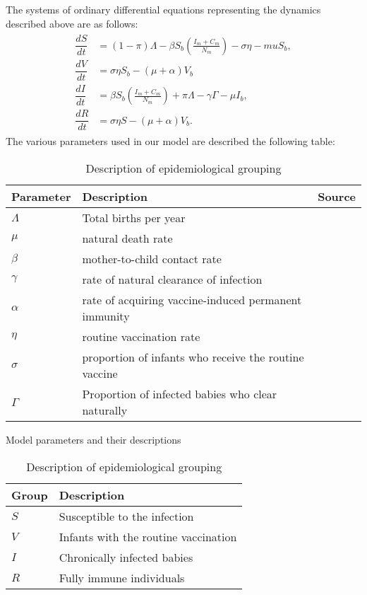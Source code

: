The systems of ordinary differential equations representing the dynamics described above are as follows:
\begin{align}
\begin{split}
\dfrac{dS}{dt}&=(1-\pi)\Lambda -\beta S_b(\frac{I_m+C_m}{N_m})-\sigma\eta-muS_b,\\
\dfrac{dV}{dt}&=\sigma\eta S_b-(\mu+\alpha) V_b\\
\dfrac{dI}{dt}&=\beta S_b(\frac{I_m+C_m}{N_m}) + \pi\Lambda-\gamma\Gamma-\mu I_b,\\
\dfrac{dR}{dt}&=\sigma\eta S - (\mu +\alpha) V_b.
\end{split}
\end{align}
The various parameters used in our model are described the following table:

\vspace{1cm}
\begin{table}[h]
	\centering
	\begin{tabular}{ |p{1.57cm}|p{10cm}|p{2cm}| }
		\hline
		Parameter& Description &    Source \\
		\hline
		$\Lambda$    		& 	Total births per year  					&																																								\\
		$	\mu $					&  	natural death rate   &																																									\\
		$\beta$ 					& 	mother-to-child contact rate &																																			\\
		$\gamma$ 			& 	rate of natural clearance of infection										&																							\\
		$\alpha$ 				& 	rate of acquiring vaccine-induced permanent immunity	&																								\\
		$\eta  $					& routine vaccination rate																&																								\\
		$\sigma$ 				& 	proportion of infants who receive the routine vaccine &																							\\
		$\Gamma$			& 	Proportion of infected babies who clear naturally		&																						\\
		\hline
	\end{tabular}
	\caption{Model parameters and their descriptions}
	\label{table:1}
	
	
		\centering
		\begin{tabular}{ |p{1.57cm}|p{12cm}| }
			\hline
			Group & Description \\
			\hline
			$	S		$    		& 		Susceptible to the infection    \\
			$	V 		$			&  	 	Infants with the routine vaccination	\\
			$	I 		$			&  	 	Chronically infected babies   		\\
			$	R		$ 			& 		Fully immune individuals		\\
			\hline
		\end{tabular}
		\caption{Description of epidemiological grouping}
		\label{table:2}
		\vspace{1mm}
\end{table}
